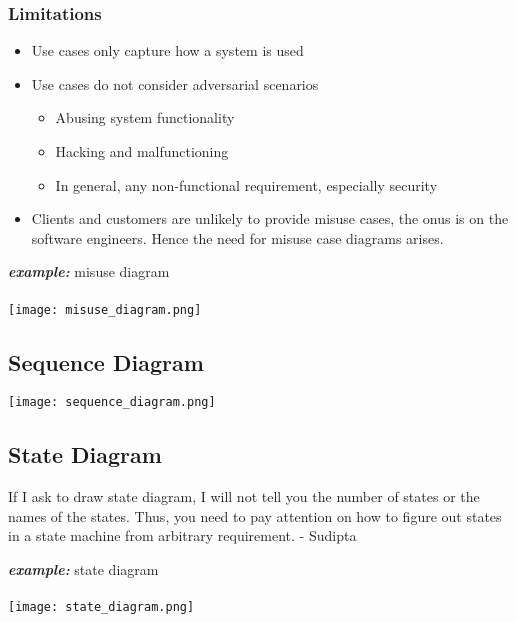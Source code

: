 \documentclass[a4paper]{article}
\begin{document}
\subsubsection{Limitations}
\begin{itemize}
	\item Use cases only capture how a system is used
	\item Use cases do not consider adversarial scenarios
	\begin{itemize}[label=$\circ$]
		\item Abusing system functionality
		\item Hacking and malfunctioning
		\item In general, any non-functional requirement, especially security
	\end{itemize}
	\item Clients and customers are unlikely to provide misuse cases, the onus is on the software engineers. Hence the need for misuse case diagrams arises.
\end{itemize}
\begin{center}
	\textit{\textbf{example: }}misuse diagram\\
	\mbox{}\\
	\texttt{[image: misuse\_diagram.png]}
\end{center}
\subsection{Sequence Diagram}
\begin{center}
	\texttt{[image: sequence\_diagram.png]}
\end{center}
\newpage
\subsection{State Diagram}
\begin{framed}
	\begin{displayquote}
		If I ask to draw state diagram, I will not tell you the number of states or the names of the states. Thus, you need to pay attention on how to figure out states in a state machine from arbitrary requirement. - Sudipta
	\end{displayquote}
\end{framed}

\begin{center}
	\textit{\textbf{example: }}state diagram\\
	\mbox{}\\
	\texttt{[image: state\_diagram.png]}
\end{center}
\end{document}
